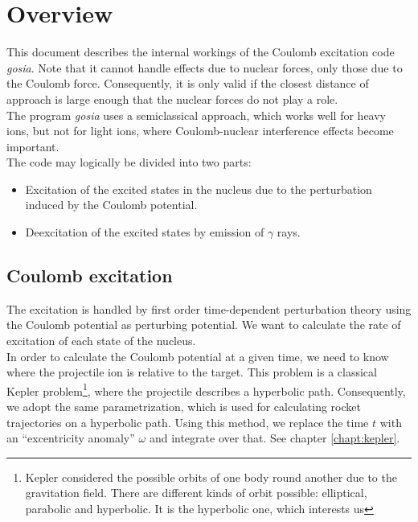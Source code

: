 \chapter{Overview}
\label{chapt:overview}

This document describes the internal workings of the Coulomb excitation code
\emph{gosia}. Note that it cannot handle effects due to nuclear forces, only
those due to the Coulomb force. Consequently, it is only valid if the
closest distance of approach is large enough that the nuclear forces do not
play a role.\\

The program \emph{gosia} uses a semiclassical approach, which works well for
heavy ions, but not for light ions, where Coulomb-nuclear interference
effects become important.\\

The code may logically be divided into two parts:\\

\begin{itemize}
\item Excitation of the excited states in the nucleus due to the
perturbation induced by the Coulomb potential.
\item Deexcitation of the excited states by emission of $\gamma$ rays.
\end{itemize}

\section{Coulomb excitation}

The excitation is handled by first order time-dependent perturbation theory
using the Coulomb potential as perturbing potential. We want to calculate
the rate of excitation of each state of the nucleus.\\

In order to calculate the Coulomb potential at a given time, we need to know
where the projectile ion is relative to the target. This problem is a
classical Kepler problem\footnote{Kepler considered the possible orbits of
one body round another due to the gravitation field. There are different
kinds of orbit possible: elliptical, parabolic and hyperbolic. It is the
hyperbolic one, which interests us}, where the projectile describes a
hyperbolic path. Consequently, we adopt the same parametrization, which is
used for calculating rocket trajectories on a hyperbolic path. Using this
method, we replace the time $t$ with an ``excentricity anomaly'' $\omega$
and integrate over that. See chapter \ref{chapt:kepler}.\\


